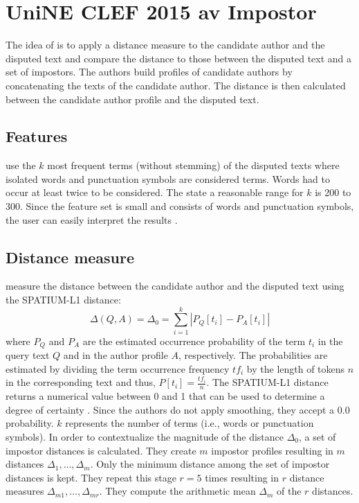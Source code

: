 \section{UniNE CLEF 2015 \ac{av} Impostor}
\label{sec:UniNE_CLEF2015_AV_impostor}

The idea of \citet{kocher_unine_2015} is to apply a distance measure to the candidate author and the disputed text and 
compare the distance to those between the disputed text and a set of impostors.
The authors build profiles of candidate authors by concatenating the texts of the candidate author.
The distance is then calculated between the candidate author profile and the disputed text.

\subsection{Features}

\citet{kocher_unine_2015} use the $k$ most frequent terms (without stemming) of the disputed texts 
where isolated words and punctuation symbols are considered terms.
Words had to occur at least twice to be considered.
The state a reasonable range for $k$ is 200 to 300.
Since the feature set is small and consists of words and punctuation symbols, 
the user can easily interpret the results \citep{kocher_unine_2015}.


\subsection{Distance measure}
\newcommand{\spldist}{SPATIUM-L1}

\citet{kocher_unine_2015} measure the distance between the candidate author and the disputed text using the \spldist{} distance:
$$\Delta(Q,A)=\Delta_0=\sum_{i=1}^{k}\left| P_Q\left[ t_i \right] -P_A\left[ t_i \right] \right|$$
where $P_Q$ and $P_A$ are the estimated occurrence probability of the term $t_i$ in the query text $Q$ and in the author profile $A$, respectively.
The probabilities are estimated by dividing the term occurrence frequency $tf_i$ by the length of tokens $n$ in the corresponding text and thus, 
$P\left[ t_i \right]=\frac{tf_i}{n}$.
The \spldist{} distance returns a numerical value between 0 and 1 that can be used to determine a degree of certainty \citep{kocher_unine_2015}.
Since the authors do not apply smoothing, they accept a 0.0 probability.
$k$ represents the number of terms (i.e., words or punctuation symbols).
In order to contextualize the magnitude of the distance $\Delta_0$, a set of impostor distances is calculated.
They create $m$ impostor profiles resulting in $m$ distances $\Delta_1, \ldots, \Delta_m$.
Only the minimum distance among the set of impostor distances is kept.
They repeat this stage $r=5$ times resulting in $r$ distance measures $\Delta_{m1}, \ldots, \Delta_{mr}$.
They compute the arithmetic mean $\Delta_m$ of the $r$ distances.

